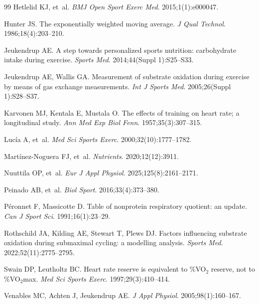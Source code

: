 \documentclass[10pt,a4paper]{article}
\begin{document}
\begin{thebibliography}{99}
Hetlelid KJ, et~al.
\newblock \emph{BMJ Open Sport Exerc Med}. 2015;1(1):e000047.

Hunter JS.
\newblock The exponentially weighted moving average.
\newblock \emph{J Qual Technol}. 1986;18(4):203--210.

Jeukendrup AE.
\newblock A step towards personalized sports nutrition: carbohydrate intake during
  exercise.
\newblock \emph{Sports Med}. 2014;44(Suppl 1):S25--S33.

Jeukendrup AE, Wallis GA.
\newblock Measurement of substrate oxidation during exercise by means of gas
  exchange measurements.
\newblock \emph{Int J Sports Med}. 2005;26(Suppl 1):S28--S37.

Karvonen MJ, Kentala E, Mustala O.
\newblock The effects of training on heart rate; a longitudinal study.
\newblock \emph{Ann Med Exp Biol Fenn}. 1957;35(3):307--315.

Lucía A, et~al.
\newblock \emph{Med Sci Sports Exerc}. 2000;32(10):1777--1782.

Martínez-Noguera FJ, et~al.
\newblock \emph{Nutrients}. 2020;12(12):3911.

Nuuttila OP, et~al.
\newblock \emph{Eur J Appl Physiol}. 2025;125(8):2161--2171.

Peinado AB, et~al.
\newblock \emph{Biol Sport}. 2016;33(4):373--380.

Péronnet F, Massicotte D.
\newblock Table of nonprotein respiratory quotient: an update.
\newblock \emph{Can J Sport Sci}. 1991;16(1):23--29.

Rothschild JA, Kilding AE, Stewart T, Plews DJ.
\newblock Factors influencing substrate oxidation during submaximal cycling: a modelling
  analysis.
\newblock \emph{Sports Med}. 2022;52(11):2775--2795.

Swain DP, Leutholtz BC.
\newblock Heart rate reserve is equivalent to \%VO$_2$ reserve, not to
  \%VO$_2$max.
\newblock \emph{Med Sci Sports Exerc}. 1997;29(3):410--414.

Venables MC, Achten J, Jeukendrup AE.
\newblock \emph{J Appl Physiol}. 2005;98(1):160--167.

\end{thebibliography}
\end{document}
